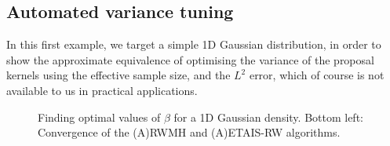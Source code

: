 \documentclass[final]{siamltex}
\begin{document}

\subsection{Automated variance tuning}
\label{sec:problem 1}
{\red In this first example, we target a simple 1D Gaussian distribution, in
order to show the approximate equivalence of optimising the variance
of the proposal kernels using the effective sample size, and the $L^2$
error, which of course is not available to us in practical
applications.}

\begin{figure}[htb]
\centering
{}

\caption{Finding optimal values of $\beta$ for a 1D Gaussian density. Bottom left: Convergence of the (A)RWMH and (A)ETAIS-RW algorithms.}
\label{fig:P1 opt beta}
\end{figure}
\end{document}
